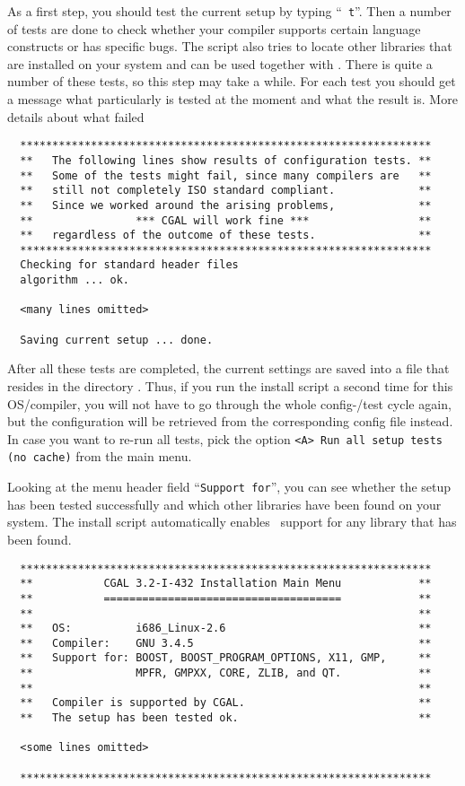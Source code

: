 As a first step, you should test the current setup by typing ``{\tt
  t}''. Then a number of tests are done to check whether your compiler
supports certain language constructs or has specific bugs. The script
also tries to locate other libraries that are installed on your system
and can be used together with \cgal. There is quite a number of these
tests, so this step may take a while.  For each test you should get a
message what particularly is tested at the moment and what the result
is. More details about what failed

{\ccTexHtml{\scriptsize}{}
\begin{verbatim}
  ****************************************************************
  **   The following lines show results of configuration tests. **
  **   Some of the tests might fail, since many compilers are   **
  **   still not completely ISO standard compliant.             **
  **   Since we worked around the arising problems,             **
  **                *** CGAL will work fine ***                 **
  **   regardless of the outcome of these tests.                **
  ****************************************************************
  Checking for standard header files
  algorithm ... ok.

  <many lines omitted>

  Saving current setup ... done.
\end{verbatim}
}

After all these tests are completed, the current settings are saved
into a file that resides in the directory \cgalinstconfdir.  Thus, if
you run the install script a second time for this OS/compiler, you
will not have to go through the whole config-/test cycle again, but
the configuration will be retrieved from the corresponding config file
instead. In case you want to re-run all tests, pick the option
\texttt{<A> Run all setup tests (no cache)} from the main menu.

Looking at the menu header field ``\texttt{Support for}'', you can see
whether the setup has been tested successfully and which other
libraries have been found on your system. The install script
automatically enables \cgal\ support for any library that has been
found.

{\ccTexHtml{\scriptsize}{}
\begin{verbatim}
  ****************************************************************
  **           CGAL 3.2-I-432 Installation Main Menu            **
  **           =====================================            **
  **                                                            **
  **   OS:          i686_Linux-2.6                              **
  **   Compiler:    GNU 3.4.5                                   **
  **   Support for: BOOST, BOOST_PROGRAM_OPTIONS, X11, GMP,     **
  **                MPFR, GMPXX, CORE, ZLIB, and QT.            **
  **                                                            **
  **   Compiler is supported by CGAL.                           **
  **   The setup has been tested ok.                            **

  <some lines omitted>

  ****************************************************************
\end{verbatim}
}

